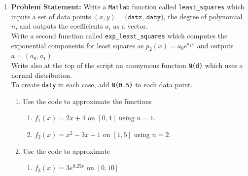 \documentclass[12pt,twoside]{amsart}
\begin{document}
\begin{enumerate}
    \item\textbf{Problem Statement:} Write a \texttt{Matlab} function called \texttt{least\_squares} which inputs a set of data points $(x, y) = \texttt{(datx, daty)}$, the degree of polynomial $n$, and outputs the coefficients $a_i$ as a vector. \\
    Write a second function called \texttt{exp\_least\_squares} which computes the exponential components for least squares as $p_2(x) = a_0e^{a_1x}$ and outputs $a = (a_0, a_1)$ \\
    Write also at the top of the script an anonymous function \texttt{N(d)} which uses a normal distribution. \\
    To create \texttt{daty} in each case, add \texttt{N(0.5)} to each data point.
    \begin{enumerate}
        \item Use the code to approximate the functions
        \begin{enumerate}
            \item $f_1(x) = 2x + 4$ on $[0, 4]$ using $n = 1$.
            \item $f_2(x) = x^2 - 3x + 1$ on $[1, 5]$ using $n = 2$.
        \end{enumerate}
        \item Use the code to approximate
        \begin{enumerate}
            \item $f_3(x) = 3e^{0.25x}$ on $[0, 10]$
        \end{enumerate}
    \end{enumerate}
    
\end{enumerate}
\end{document}
